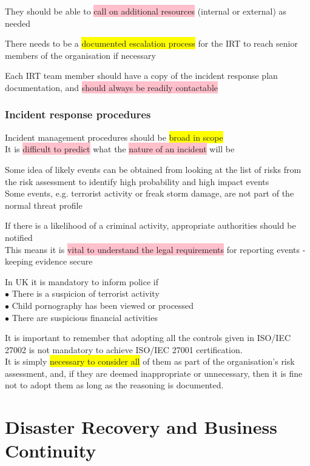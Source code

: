 \documentclass[tikz,border=10pt]{project_plan}
\newcommand{\bulletPoint}{\hspace{-3.1pt}$\bullet$ \hspace{5pt}}
\begin{document}
They should be able to \colorbox{pink}{call on additional resources} (internal or external) as needed

There needs to be a \colorbox{yellow}{documented escalation process} for the IRT to reach senior members of the organisation if necessary

Each IRT team member should have a copy of the incident response plan documentation, and \colorbox{pink}{should always be readily contactable}

\subsubsection{Incident response procedures}

Incident management procedures should be \colorbox{yellow}{broad in scope}\\
It is \colorbox{pink}{difficult to predict} what the \colorbox{pink}{nature of an incident} will be

Some idea of likely events can be obtained from looking at the list of risks from the risk assessment to identify high probability and high impact events\\
Some events, e.g. terrorist activity or freak storm damage, are not part of the normal threat profile

If there is a likelihood of a criminal activity, appropriate authorities should be notified\\
This means it is \colorbox{pink}{vital to understand the legal requirements} for reporting events - keeping evidence secure

In UK it is mandatory to inform police if\\
\bulletPoint There is a suspicion of terrorist activity\\
\bulletPoint Child pornography has been viewed or processed\\
\bulletPoint There are suspicious financial activities

It is important to remember that adopting all the controls given in ISO/IEC 27002
is not mandatory to achieve ISO/IEC 27001 certification.\\
It is simply \colorbox{yellow}{necessary to consider all} of them as part of the organisation’s risk
assessment, and, if they are deemed inappropriate or unnecessary, then it is
fine not to adopt them as long as the reasoning is documented.

\newpage
\section{Disaster Recovery and Business Continuity}
\end{document}
